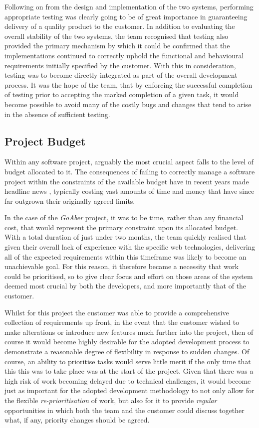Following on from the design and implementation of the two systems, performing appropriate testing was clearly going to be of great importance in guaranteeing delivery of a quality product to the customer. In addition to evaluating the overall stability of the two systems, the team recognised that testing also provided the primary mechanism by which it could be confirmed that the implementations continued to correctly uphold the functional and behavioural requirements initially specified by the customer. With this in consideration, testing was to become directly integrated as part of the overall development process. It was the hope of the team, that by enforcing the successful completion of testing prior to accepting the marked completion of a given task, it would become possible to avoid many of the costly bugs and changes that tend to arise in the absence of sufficient testing. 
 
 \subsection{Project Budget}

Within any software project, arguably the most crucial aspect falls to the level of budget allocated to it. The consequences of failing to correctly manage a software project within the constraints of the available budget have in recent years made headline news \cite{bbc-it}, typically costing vast amounts of time and money that have since far outgrown their originally agreed limits.

In the case of the \textit{GoAber} project, it was to be time, rather than any financial cost, that would represent the primary constraint upon its allocated budget. With a total duration of just under two months, the team quickly realised that given their overall lack of experience with the specific web technologies, delivering all of the expected requirements within this timeframe was likely to become an unachievable goal. For this reason, it therefore became a necessity that work could be prioritised, so to give clear focus and effort on those areas of the system deemed most crucial by both the developers, and more importantly that of the customer. 

 Whilst for this project the customer was able to provide a comprehensive collection of requirements up front, in the event that the customer wished to make alterations or introduce new features much further into the project, then of course it would become highly desirable for the adopted development process to demonstrate a reasonable degree of flexibility in response to sudden changes. Of course, an ability to prioritise tasks would serve little merit if the only time that this this was to take place was at the start of the project. Given that there was a high risk of work becoming delayed due to technical challenges, it would become just as important for the adopted development methodology to not only allow for the flexible \textit{re-prioritisation} of work, but also for it to provide \textit{regular} opportunities in which both the team and the customer could discuss together what, if any, priority changes should be agreed.
 

